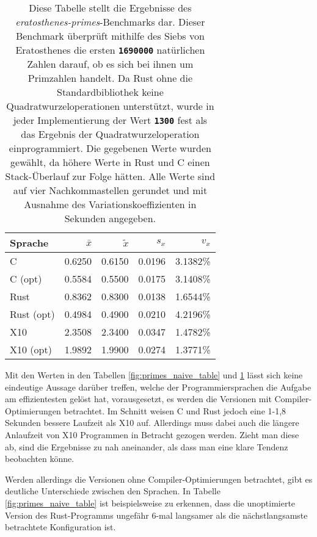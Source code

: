 \begin{table}
	\begin{center}
		\begin{tabular}{lrrrr}
			\toprule
			Sprache    & $\bar{x}$ & $\tilde{x}$ & $s_x$ & $v_x$ \\
			\midrule
			C          & 0.6250 & 0.6150 & 0.0196 & 3.1382\% \\
			C (opt)    & 0.5584 & 0.5500 & 0.0175 & 3.1408\% \\
			Rust       & 0.8362 & 0.8300 & 0.0138 & 1.6544\% \\
			Rust (opt) & 0.4984 & 0.4900 & 0.0210 & 4.2196\% \\
			X10        & 2.3508 & 2.3400 & 0.0347 & 1.4782\% \\
			X10 (opt)  & 1.9892 & 1.9900 & 0.0274 & 1.3771\% \\
			\bottomrule
		\end{tabular}
	\end{center}
	\caption{
		Diese Tabelle stellt die Ergebnisse des \textit{eratosthenes-primes}-Benchmarks dar.
		Dieser Benchmark überprüft mithilfe des Siebs von Eratosthenes die ersten \texttt{\textsc{\textbf{1690000}}}
		natürlichen Zahlen darauf, ob es sich bei ihnen um Primzahlen handelt.
		Da Rust ohne die Standardbibliothek keine Quadratwurzeloperationen
		unterstützt, wurde in jeder Implementierung der Wert \texttt{\textsc{\textbf{1300}}} fest als das Ergebnis
		der Quadratwurzeloperation einprogrammiert.
		Die gegebenen Werte wurden gewählt, da höhere Werte in Rust und C einen Stack-Überlauf zur Folge hätten.
		Alle Werte sind auf vier Nachkommastellen gerundet und mit Ausnahme des Variationskoeffizienten
		in Sekunden angegeben.
	}
	\label{fig:primes_eratosthenes_table}
\end{table}

Mit den Werten in den Tabellen \ref{fig:primes_naive_table} und \ref{fig:primes_eratosthenes_table} lässt sich keine
eindeutige Aussage darüber treffen, welche der Programmiersprachen die Aufgabe am effizientesten
gelöst hat, vorausgesetzt, es werden die Versionen mit Compiler-Optimierungen betrachtet. Im Schnitt weisen C und Rust
jedoch eine 1-1,8 Sekunden bessere Laufzeit als X10 auf.
Allerdings muss dabei auch die längere Anlaufzeit von X10 Programmen in Betracht gezogen werden.
Zieht man diese ab, sind die Ergebnisse zu nah aneinander, als dass man eine klare Tendenz beobachten könne.

Werden allerdings die Versionen ohne Compiler-Optimierungen betrachtet, gibt es deutliche Unterschiede zwischen den
Sprachen. In Tabelle \ref{fig:primes_naive_table} ist beispielsweise zu erkennen, dass die unoptimierte
Version des Rust-Programms ungefähr 6-mal langsamer als die nächstlangsamste betrachtete Konfiguration ist.


